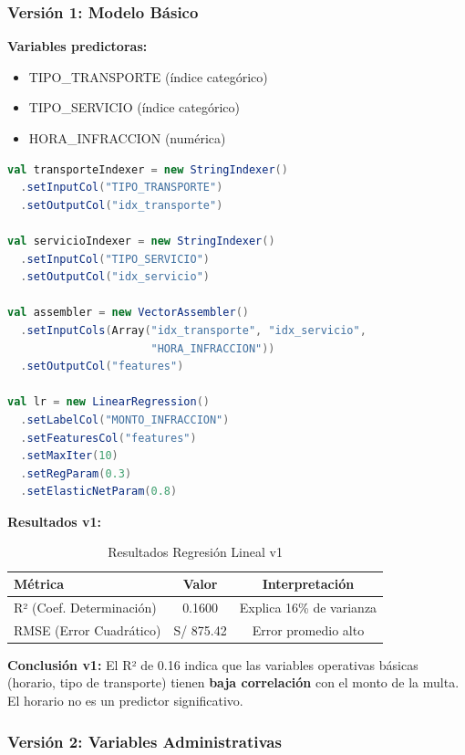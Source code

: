 \documentclass[12pt,a4paper]{article}
\begin{document}
\subsubsection{Versión 1: Modelo Básico}

\textbf{Variables predictoras:}
\begin{itemize}
    \item TIPO\_TRANSPORTE (índice categórico)
    \item TIPO\_SERVICIO (índice categórico)
    \item HORA\_INFRACCION (numérica)
\end{itemize}

\begin{lstlisting}[language=Scala, caption={Regresión Lineal v1 - Variables básicas}]
val transporteIndexer = new StringIndexer()
  .setInputCol("TIPO_TRANSPORTE")
  .setOutputCol("idx_transporte")

val servicioIndexer = new StringIndexer()
  .setInputCol("TIPO_SERVICIO")
  .setOutputCol("idx_servicio")

val assembler = new VectorAssembler()
  .setInputCols(Array("idx_transporte", "idx_servicio", 
                      "HORA_INFRACCION"))
  .setOutputCol("features")

val lr = new LinearRegression()
  .setLabelCol("MONTO_INFRACCION")
  .setFeaturesCol("features")
  .setMaxIter(10)
  .setRegParam(0.3)
  .setElasticNetParam(0.8)
\end{lstlisting}

\textbf{Resultados v1:}

\begin{table}[H]
\centering
\begin{tabular}{lcc}
\toprule
\textbf{Métrica} & \textbf{Valor} & \textbf{Interpretación} \\
\midrule
R² (Coef. Determinación) & 0.1600 & Explica 16\% de varianza \\
RMSE (Error Cuadrático) & S/ 875.42 & Error promedio alto \\
\bottomrule
\end{tabular}
\caption{Resultados Regresión Lineal v1}
\label{tab:lr_v1}
\end{table}

\textbf{Conclusión v1:} El R² de 0.16 indica que las variables operativas básicas (horario, tipo de transporte) tienen \textbf{baja correlación} con el monto de la multa. El horario no es un predictor significativo.

\subsubsection{Versión 2: Variables Administrativas}
\end{document}
